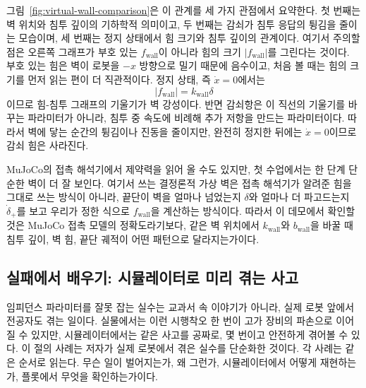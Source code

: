 그림~\ref{fig:virtual-wall-comparison}은 이 관계를 세 가지 관점에서 요약한다.
첫 번째는 벽 위치와 침투 깊이의 기하학적 의미이고, 두 번째는 감쇠가 침투 응답의 튕김을 줄이는 모습이며, 세 번째는 정지 상태에서 힘 크기와 침투 깊이의 관계이다.
여기서 주의할 점은 오른쪽 그래프가 부호 있는 $f_{\mathrm{wall}}$이 아니라 힘의 크기 $|f_{\mathrm{wall}}|$를 그린다는 것이다.
부호 있는 힘은 벽이 로봇을 $-x$ 방향으로 밀기 때문에 음수이고, 처음 볼 때는 힘의 크기를 먼저 읽는 편이 더 직관적이다.
정지 상태, 즉 $\dot{x}=0$에서는
\begin{equation}
  |f_{\mathrm{wall}}|
  =
  k_{\mathrm{wall}}\delta
\end{equation}
이므로 힘-침투 그래프의 기울기가 벽 강성이다.
반면 감쇠항은 이 직선의 기울기를 바꾸는 파라미터가 아니라, 침투 중 속도에 비례해 추가 저항을 만드는 파라미터이다.
따라서 벽에 닿는 순간의 튕김이나 진동을 줄이지만, 완전히 정지한 뒤에는 $\dot{x}=0$이므로 감쇠 힘은 사라진다.



MuJoCo의 접촉 해석기에서 제약력을 읽어 올 수도 있지만, 첫 수업에서는 한 단계 단순한 벽이 더 잘 보인다.
여기서 쓰는 결정론적 가상 벽은 접촉 해석기가 알려준 힘을 그대로 쓰는 방식이 아니라, 끝단이 벽을 얼마나 넘었는지 $\delta$와 얼마나 더 파고드는지 $\dot{\delta}_+$를 보고 우리가 정한 식으로 $f_{\mathrm{wall}}$을 계산하는 방식이다.
따라서 이 데모에서 확인할 것은 MuJoCo 접촉 모델의 정확도라기보다, 같은 벽 위치에서 $k_{\mathrm{wall}}$와 $b_{\mathrm{wall}}$을 바꿀 때 침투 깊이, 벽 힘, 끝단 궤적이 어떤 패턴으로 달라지는가이다.

\subsection{실패에서 배우기: 시뮬레이터로 미리 겪는 사고}
\label{sec:failure-gallery}

임피던스 파라미터를 잘못 잡는 실수는 교과서 속 이야기가 아니라, 실제 로봇 앞에서 전공자도 겪는 일이다.
실물에서는 이런 시행착오 한 번이 고가 장비의 파손으로 이어질 수 있지만, 시뮬레이터에서는 같은 사고를 공짜로, 몇 번이고 안전하게 겪어볼 수 있다.
%
이 절의 사례는 저자가 실제 로봇에서 겪은 실수를 단순화한 것이다.
각 사례는 같은 순서로 읽는다.
무슨 일이 벌어지는가, 왜 그런가, 시뮬레이터에서 어떻게 재현하는가, 플롯에서 무엇을 확인하는가이다.

